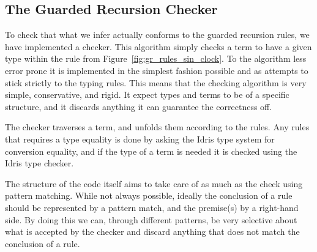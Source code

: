 



\subsection{The Guarded Recursion Checker}
To check that what we infer actually conforms to the guarded recursion rules, we
have implemented a checker. This algorithm simply checks a term to have a given
type within the rule from Figure~\ref{fig:gr_rules_sin_clock}. To the algorithm
less error prone it is implemented in the simplest fashion possible and as
attempts to stick strictly to the typing rules. This means that the checking
algorithm is very simple, conservative, and rigid. It expect types and terms to
be of a specific structure, and it discards anything it can guarantee the
correctness off. 

The checker traverses a term, and unfolds them according to the rules. Any rules
that requires a type equality is done by asking the Idris type system for
conversion equality, and if the type of a term is needed it is checked using the
Idris type checker.

The structure of the code itself aims to take care of as much as the check using
pattern matching. While not always possible, ideally the conclusion of a rule
should be represented by a pattern match, and the premise(s) by a right-hand
side. By doing this we can, through different patterns, be very selective about
what is accepted by the checker and discard anything that does not match the
conclusion of a rule.

